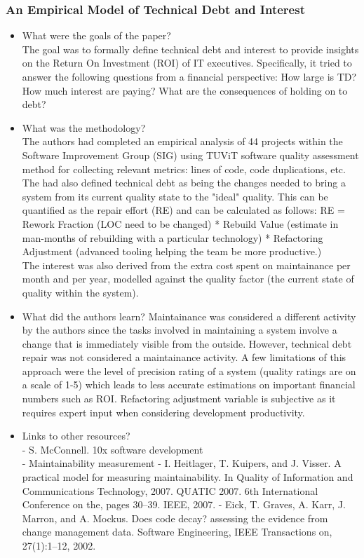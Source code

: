 \documentclass{mprop}
\begin{document}
\subsubsection{An Empirical Model of Technical Debt and Interest}  \cite{Nugroho2011}

\begin{itemize}
	\item What were the goals of the paper? \\
	The goal was to formally define technical debt and interest to provide insights on the Return On Investment (ROI) of IT executives. 
	Specifically, it tried to answer the following questions from a financial perspective: How large is TD? How much interest are paying? What are the consequences of holding on to debt?
	\item What was the methodology? \\
	The authors had completed an empirical analysis of 44 projects within the Software Improvement Group (SIG) using TUViT software quality assessment method for collecting relevant metrics: lines of code, code duplications, etc.
	The had also defined technical debt as being the changes needed to bring a system from its current quality state to the "ideal" quality. This can be quantified as the repair effort (RE) and can be calculated as follows:
	RE = Rework Fraction (LOC need to be changed) * Rebuild Value (estimate in man-months of rebuilding with a particular technology) * Refactoring Adjustment (advanced tooling helping the team be more productive.)\\
	The interest was also derived from the extra cost spent on maintainance per month and per year, modelled against the quality factor (the current state of quality within the system). 
	\item What did the authors learn?
	Maintainance was considered a different activity by the authors since the tasks involved in maintaining a system involve a change that is immediately visible from the outside.
	However, technical debt repair was not considered a maintainance activity.
	A few limitations of this approach were the level of precision rating of a system (quality ratings are on a scale of 1-5) which leads to less accurate estimations on important financial numbers such as ROI.
	Refactoring adjustment variable is subjective as it requires expert input when considering development productivity.
	\item Links to other resources? \\
	- S. McConnell. 10x software development \\
	- Maintainability measurement - I. Heitlager, T. Kuipers, and J. Visser. A practical model for measuring maintainability. In Quality of Information and Communications Technology, 2007. QUATIC 2007. 6th International Conference on the, pages 30–39. IEEE, 2007.
	- Eick, T. Graves, A. Karr, J. Marron, and A. Mockus. Does code decay? assessing the evidence from change management data. Software Engineering, IEEE Transactions on, 27(1):1–12, 2002.
\end{itemize}
\end{document}
